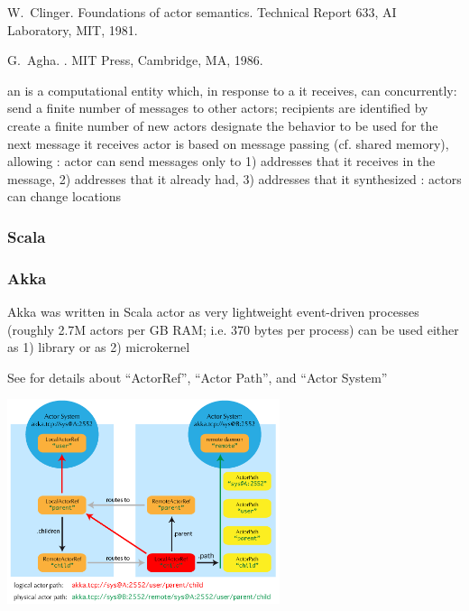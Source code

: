 \documentclass{myproc}
\begin{document}
\w W.~Clinger.
\newblock Foundations of actor semantics.
\newblock Technical Report 633, AI Laboratory, MIT, 1981.

\w G.~Agha.
.
\newblock MIT Press, Cambridge, MA, 1986.
\eit

\bit
\w an  is a computational entity which, in response to a
 it receives, can concurrently:
  \bit
  \w send a finite number of messages to other actors; recipients are
  identified by  
  \w create a finite number of new actors
  \w designate the behavior to be used for the next message it receives
  \eit
\w actor is based on message passing (cf. shared memory), allowing
\w {}: actor can send messages only to 1) {addresses that it
  receives in the message}, 2) addresses that it already had, 3) addresses
  that it synthesized
\w {}: actors can change locations
\eit


\subsubsection{Scala}
\subsubsection{Akka}
\bit
\w Akka was written in Scala
\w actor as very lightweight event-driven processes (roughly 2.7M actors per
GB RAM; i.e. 370 bytes per process) 
\w can be used either as 1) \textcolor{red2}{library} or as 2)
\textcolor{red2}{microkernel} 

\w See  for details about ``ActorRef'', ``Actor
Path'', and ``Actor System''

\vspace*{0.2cm}

\centerline{\includegraphics[width=8cm]{pics/remote-deployment}}
\end{document}
